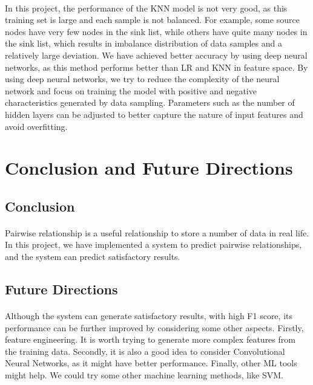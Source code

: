 \documentclass[fleqn,11pt]{olplainarticle}
\begin{document}
\paragraph*{}
In this project,  the performance of the KNN model is not very good, as this training set is large and each sample is not balanced. For example, some source nodes have very few nodes in the sink list, while others have quite many nodes in the sink list, which results in imbalance distribution of data samples and a relatively large deviation. We have achieved better accuracy by using deep neural networks, as this method performs better than LR and KNN in feature space. By using deep neural networks, we try to reduce the complexity of the neural network and focus on training the model with positive and negative characteristics generated by data sampling. Parameters such as the number of hidden layers can be adjusted to better capture the nature of input features and avoid overfitting.


\section{Conclusion and Future Directions}\label{conclu}
\subsection{Conclusion}\label{con}
\paragraph*{}
Pairwise relationship is a useful relationship to store a number of data in real life. In this project, we have implemented a system to predict pairwise relationships, and the system can predict satisfactory results.
\subsection{Future Directions}\label{future}
\paragraph*{}
Although the system can generate satisfactory results, with high F1 score, its performance can be further improved by considering some other aspects. Firstly, feature engineering. It is worth trying to generate more complex features from the training data. Secondly, it is also a good idea to consider Convolutional Neural Networks, as it might have better performance. Finally, other ML tools might help. We could try some other machine learning methods, like SVM.




\end{document}
